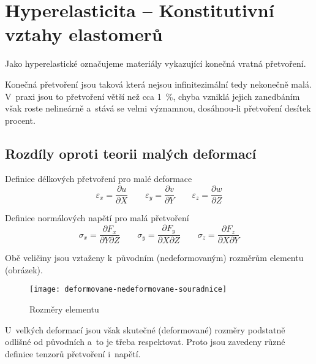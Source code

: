 
\section{Hyperelasticita -- Konstitutivní vztahy elastomerů}

Jako hyperelastické označujeme materiály vykazující konečná vratná přetvoření.

Konečná přetvoření jsou taková která nejsou infinitezimální tedy nekonečně malá.
V~praxi jsou to přetvoření větší než cca \SI{1}{\percent}, chyba vzniklá jejich zanedbáním však roste nelineárně a~stává se velmi významnou, dosáhnou-li přetvoření desítek procent. 

\subsection{Rozdíly oproti teorii malých deformací}

Definice délkových přetvoření pro malé deformace
\begin{equation}\label{pretvoreni_male_deformace}
	\varepsilon_x = \frac{\partial u}{\partial X}
	\qquad
	\varepsilon_y = \frac{\partial v}{\partial Y}
	\qquad
	\varepsilon_z = \frac{\partial w}{\partial Z}
\end{equation}

Definice normálových napětí pro malá přetvoření
\begin{equation}\label{napeti_male_deformace}
	\sigma_x = \frac{\partial F_x}{\partial Y \partial Z}
	\qquad
	\sigma_y = \frac{\partial F_y}{\partial X \partial Z}
	\qquad
	\sigma_z = \frac{\partial F_z}{\partial X \partial Y}
\end{equation}

Obě veličiny jsou vztaženy k~původním (nedeformovaným) rozměrům elementu (obrázek).
\begin{figure}[H]
	\centering
	\texttt{[image: deformovane-nedeformovane-souradnice]}
	\caption{Rozměry elementu}
\end{figure}

U~velkých deformací jsou však skutečné (deformované) rozměry podstatně odlišné od původních a~to je třeba respektovat.
Proto jsou zavedeny různé definice tenzorů přetvoření i~napětí.

